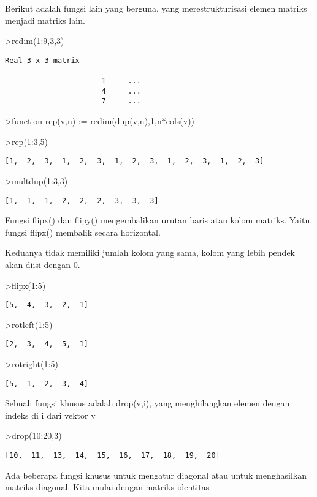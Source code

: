 \documentclass[
]{book}
\begin{document}
Berikut adalah fungsi lain yang berguna, yang merestrukturisasi elemen matriks menjadi matriks lain.

\textgreater redim(1:9,3,3)

\begin{verbatim}
Real 3 x 3 matrix

                      1     ...
                      4     ...
                      7     ...
\end{verbatim}

\textgreater function rep(v,n) := redim(dup(v,n),1,n*cols(v))

\textgreater rep(1:3,5)

\begin{verbatim}
[1,  2,  3,  1,  2,  3,  1,  2,  3,  1,  2,  3,  1,  2,  3]
\end{verbatim}

\textgreater multdup(1:3,3)

\begin{verbatim}
[1,  1,  1,  2,  2,  2,  3,  3,  3]
\end{verbatim}

Fungsi flipx() dan flipy() mengembalikan urutan baris atau kolom matriks. Yaitu, fungsi flipx() membalik secara horizontal.

Keduanya tidak memiliki jumlah kolom yang sama, kolom yang lebih pendek akan diisi dengan 0.

\textgreater flipx(1:5)

\begin{verbatim}
[5,  4,  3,  2,  1]
\end{verbatim}

\textgreater rotleft(1:5)

\begin{verbatim}
[2,  3,  4,  5,  1]
\end{verbatim}

\textgreater rotright(1:5)

\begin{verbatim}
[5,  1,  2,  3,  4]
\end{verbatim}

Sebuah fungsi khusus adalah drop(v,i), yang menghilangkan elemen dengan indeks di i dari vektor v

\textgreater drop(10:20,3)

\begin{verbatim}
[10,  11,  13,  14,  15,  16,  17,  18,  19,  20]
\end{verbatim}

Ada beberapa fungsi khusus untuk mengatur diagonal atau untuk menghasilkan matriks diagonal. Kita mulai dengan matriks identitas
\end{document}
